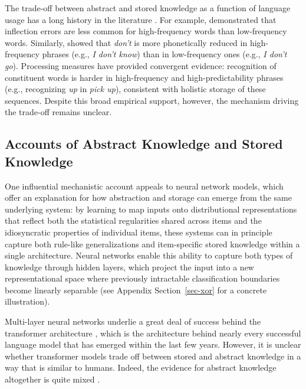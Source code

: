 \documentclass{article}
\begin{document}
The trade-off between abstract and stored knowledge as a function of
language usage has a long history in the literature
\citep[e.g.,][]{bybee1999usagebasedphonology, kapatsinski2010frequencyuseleads, kapatsinskiFrequencyEmergencePrefabs2009, stembergerAreInflectedForms2004, stembergerFrequencyLexicalStorage1986, houghton2025multiwordrepresentationsminds, morgan2016abstractknowledgedirect, morganFrequencydependentRegularizationIterated2016a, morganModelingIdiosyncraticPreferences2015}.
For example, \citet{stembergerAreInflectedForms2004} demonstrated that
inflection errors are less common for high-frequency words than
low-frequency words. Similarly, \citet{bybee1999usagebasedphonology}
showed that \emph{don't} is more phonetically reduced in high-frequency
phrases (e.g., \emph{I don't know}) than in low-frequency ones (e.g.,
\emph{I don't go}). Processing measures have provided convergent
evidence: recognition of constituent words is harder in high-frequency
\citep{kapatsinskiFrequencyEmergencePrefabs2009} and high-predictability
\citep{houghton2025multiwordrepresentationsminds} phrases (e.g.,
recognizing \emph{up} in \emph{pick up}), consistent with holistic
storage of these sequences. Despite this broad empirical support,
however, the mechanism driving the trade-off remains unclear.

\subsection{Accounts of Abstract Knowledge and Stored
Knowledge}\label{accounts-of-abstract-knowledge-and-stored-knowledge}

One influential mechanistic account appeals to neural network models,
which offer an explanation for how abstraction and storage can emerge
from the same underlying system: by learning to map inputs onto
distributional representations that reflect both the statistical
regularities shared across items and the idiosyncratic properties of
individual items, these systems can in principle capture both rule-like
generalizations and item-specific stored knowledge within a single
architecture. Neural networks enable this ability to capture both types
of knowledge through hidden layers, which project the input into a new
representational space where previously intractable classification
boundaries become linearly separable (see Appendix Section~\ref{sec-xor}
for a concrete illustration).

Multi-layer neural networks underlie a great deal of success behind the
transformer architecture \citep{vaswaniAttentionAllYou2017}, which is
the architecture behind nearly every successful language model that has
emerged within the last few years. However, it is unclear whether
transformer models trade off between stored and abstract knowledge in a
way that is similar to humans. Indeed, the evidence for abstract
knowledge altogether is quite mixed
\citep{haleyThisBERTNow2020, lasriSubjectVerbAgreement2022, liAssessingCapacityTransformer2023, li2021areneuralnetworks, houghton2025roleabstractrepresentations, mccoy2023howmuchlanguage, misraLanguageModelsLearn2024, yaoBothDirectIndirect2025, kapatsinski2026transformersperformadaptive, jian2026humans}.
\end{document}
